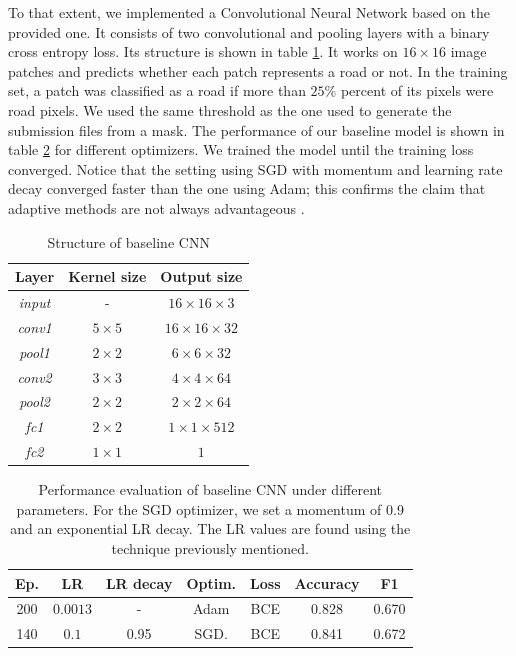 \documentclass[10pt,conference,compsocconf]{IEEEtran}
\begin{document}
To that extent, we implemented a Convolutional Neural Network based on the provided one. It consists of two convolutional and pooling layers with a binary cross entropy loss. Its structure is shown in table \ref{tab:cnn_struct}. It works on $16 \times 16$ image patches and predicts whether each patch represents a road or not. In the training set, a patch was classified as a road if more than $25\%$ percent of its pixels were road pixels. We used the same threshold as the one used to generate the submission files from a mask. The performance of our baseline model is shown in table \ref{tab:cnn-perf} for different optimizers. We trained the model until the training loss converged. Notice that the setting using SGD with momentum and learning rate decay converged faster than the one using Adam; this confirms the claim that adaptive methods are not always advantageous \cite{wilson2018marginal}.

\begin{table}[ht]
    \centering
    \begin{tabular}{|c|c|c|}
        \hline
        Layer & Kernel size     & Output size  \\ \hline
        \textit{input} & -               & $16 \times 16 \times 3$\\ \hline
        \textit{conv1} & $5 \times 5$    & $16 \times 16 \times 32$ \\ \hline
        \textit{pool1} & $2 \times 2$    & $6 \times 6 \times 32 $\\ \hline
        \textit{conv2} & $3 \times 3$    & $ 4 \times 4 \times 64$ \\ \hline
        \textit{pool2} & $2 \times 2$    & $2 \times 2 \times 64$ \\ \hline
        \textit{fc1}   & $2 \times 2$    & $1 \times 1 \times 512$ \\ \hline
        \textit{fc2}   & $1 \times 1$    & $1$ \\ \hline
    \end{tabular}
    \caption{Structure of baseline CNN}
    \label{tab:cnn_struct}
\end{table}

\begin{table}[ht]
    \centering
    \begin{tabular}{|c|c|c|c|c|c|c|}
    \hline
        Ep.     & LR        & LR decay & Optim.     & Loss & Accuracy & F1      \\ \hline \hline
        200     & $0.0013$  & -        & Adam       & BCE  & 0.828   & 0.670   \\ \hline %
        140     & $0.1$     & 0.95     & SGD.       & BCE  & 0.841   & 0.672   \\ \hline %
        
    \end{tabular}
    \caption{Performance evaluation of baseline CNN under different parameters. For the SGD optimizer, we set a momentum of 0.9 and an exponential LR decay. The LR values are found using the technique previously mentioned.}
    \label{tab:cnn-perf}
\end{table}
\end{document}
